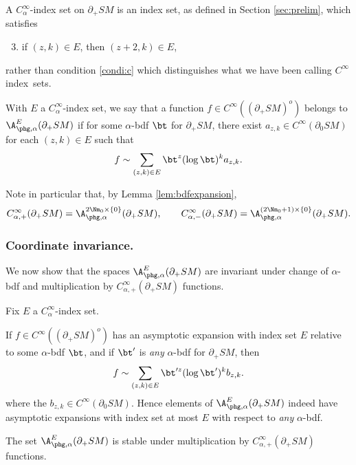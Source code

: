 \begin{Definition}
A $C_\alpha^\infty$-index set on $\partial_+ SM$ is an index set, as defined in Section \ref{sec:prelim}, which satisfies
\begin{enumerate}\setcounter{enumi}{2}\renewcommand{\theenumi}{\alph{enumi}'}
\item\label{condi:c'}
if $(z,k)\in E$, then $(z+2,k)\in E$,
\end{enumerate}
rather than condition \eqref{condi:c} which distinguishes what we have been calling $C^\infty$ index~sets.

With $E$ a $C_\alpha^\infty$-index set, we say that a function $f\in C^\infty((\partial_{+}SM)^o)$ belongs to $\A_{\phg,\alpha}^E(\partial_+ SM)$ if for some $\alpha$-bdf $\bt$ for $\partial_+ SM$, there exist $a_{z,k}\in C^\infty (\partial_0 SM)$ for each $(z,k)\in E$ such that
\begin{equation*}
f \sim \sum_{(z,k)\in E} \bt^z (\log \bt)^k a_{z,k}.
\end{equation*}
\end{Definition}

Note in particular that, by Lemma \ref{lem:bdfexpansion},
\begin{equation*}
C^\infty_{\alpha,+} (\partial_+ SM) = \A_{\phg,\alpha}^{2\Nm_0\times \{0\}} (\partial_+ SM), \qquad C^\infty_{\alpha,-} (\partial_+ SM) = \A_{\phg,\alpha}^{(2\Nm_0+1)\times \{0\}} (\partial_+ SM).
\end{equation*}

\subsubsection*{Coordinate invariance.}
We now show that the spaces $\A_{\phg,\alpha}^E (\partial_+ SM)$ are invariant under change of $\alpha$-bdf and multiplication by $C_{\alpha,+}^\infty (\partial_+ SM)$ functions.

\begin{Proposition} Fix $E$ a $C^\infty_\alpha$-index set.
\begin{enumeratea}
\item
If $f\in C^\infty((\partial_+ SM)^o)$ has an asymptotic expansion with index set $E$ relative to some $\alpha$-bdf $\bt$, and if $\bt'$ is \emph{any} $\alpha$-bdf for $\partial_+ SM$, then\vspace*{-3pt}
\begin{equation*}
f \sim \sum_{(z,k)\in E} \bt'^z (\log \bt')^k b_{z,k}.
\end{equation*}
where the $b_{z,k} \in C^\infty(\partial_0 SM)$. Hence elements of $\A_{\phg,\alpha}^E(\partial_+ SM)$ indeed have asymptotic expansions with index set at most $E$ with respect to {\em any} $\alpha$-bdf.

\item
The set $\A_{\phg,\alpha}^E(\partial_+ SM)$ is stable under multiplication by $C_{\alpha,+}^\infty(\partial_+ SM)$ functions.
\end{enumeratea}
\end{Proposition}

